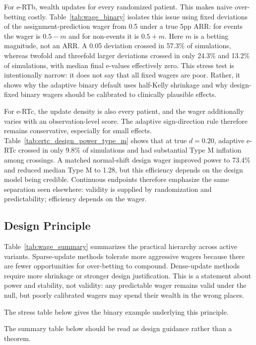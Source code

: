 \documentclass[10pt]{article}
\begin{document}
For e-RTb, wealth updates for every randomized patient. This makes naive over-betting costly. Table~\ref{tab:wage_binary} isolates this issue using fixed deviations of the assignment-prediction wager from 0.5 under a true 5pp ARR: for events the wager is $0.5-m$ and for non-events it is $0.5+m$. Here $m$ is a betting magnitude, not an ARR. A 0.05 deviation crossed in 57.3\% of simulations, whereas twofold and threefold larger deviations crossed in only 24.3\% and 13.2\% of simulations, with median final e-values effectively zero. This stress test is intentionally narrow: it does not say that all fixed wagers are poor. Rather, it shows why the adaptive binary default uses half-Kelly shrinkage and why design-fixed binary wagers should be calibrated to clinically plausible effects.

For e-RTc, the update density is also every patient, and the wager additionally varies with an observation-level score. The adaptive sign-direction rule therefore remains conservative, especially for small effects. Table~\ref{tab:ertc_design_power_type_m} shows that at true $d=0.20$, adaptive e-RTc crossed in only 9.8\% of simulations and had substantial Type M inflation among crossings. A matched normal-shift design wager improved power to 73.4\% and reduced median Type M to 1.28, but this efficiency depends on the design model being credible. Continuous endpoints therefore emphasize the same separation seen elsewhere: validity is supplied by randomization and predictability; efficiency depends on the wager.

\subsection{Design Principle}

Table~\ref{tab:wage_summary} summarizes the practical hierarchy across active variants. Sparse-update methods tolerate more aggressive wagers because there are fewer opportunities for over-betting to compound. Dense-update methods require more shrinkage or stronger design justification. This is a statement about power and stability, not validity: any predictable wager remains valid under the null, but poorly calibrated wagers may spend their wealth in the wrong places.

The stress table below gives the binary example underlying this principle.



The summary table below should be read as design guidance rather than a theorem.
\end{document}
